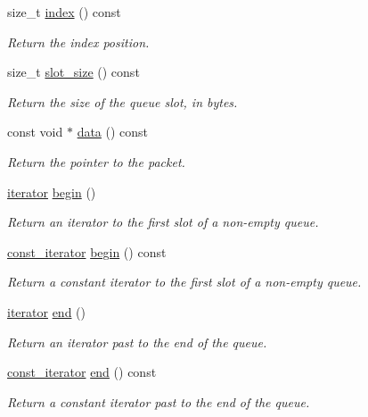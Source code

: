 \begin{DoxyCompactItemize}
size\+\_\+t \hyperlink{classpfq_1_1net__queue_ab33bdebd885e677a3e079c0193624e52}{index} () const 
\begin{DoxyCompactList}\small\item\em Return the index position. \end{DoxyCompactList}\item 
size\+\_\+t \hyperlink{classpfq_1_1net__queue_a9f745871293123f417a492aa861c13cc}{slot\+\_\+size} () const 
\begin{DoxyCompactList}\small\item\em Return the size of the queue slot, in bytes. \end{DoxyCompactList}\item 
const void $\ast$ \hyperlink{classpfq_1_1net__queue_a28a03d4dbdf57d4bc70266a174d34514}{data} () const 
\begin{DoxyCompactList}\small\item\em Return the pointer to the packet. \end{DoxyCompactList}\item 
\hyperlink{structpfq_1_1net__queue_1_1iterator}{iterator} \hyperlink{classpfq_1_1net__queue_a36d91779a4ac2a6e3f7e63ff8594ada7}{begin} ()
\begin{DoxyCompactList}\small\item\em Return an iterator to the first slot of a non-\/empty queue. \end{DoxyCompactList}\item 
\hyperlink{structpfq_1_1net__queue_1_1const__iterator}{const\+\_\+iterator} \hyperlink{classpfq_1_1net__queue_a1355ab3d8cd90fa8dafb6b5d44aef22c}{begin} () const 
\begin{DoxyCompactList}\small\item\em Return a constant iterator to the first slot of a non-\/empty queue. \end{DoxyCompactList}\item 
\hyperlink{structpfq_1_1net__queue_1_1iterator}{iterator} \hyperlink{classpfq_1_1net__queue_acef930aef921f06803621af79f993b25}{end} ()
\begin{DoxyCompactList}\small\item\em Return an iterator past to the end of the queue. \end{DoxyCompactList}\item 
\hyperlink{structpfq_1_1net__queue_1_1const__iterator}{const\+\_\+iterator} \hyperlink{classpfq_1_1net__queue_aa756544d9d17ce6d0ede19328f7dda44}{end} () const 
\begin{DoxyCompactList}\small\item\em Return a constant iterator past to the end of the queue. \end{DoxyCompactList}\item 

\end{DoxyCompactItemize}
